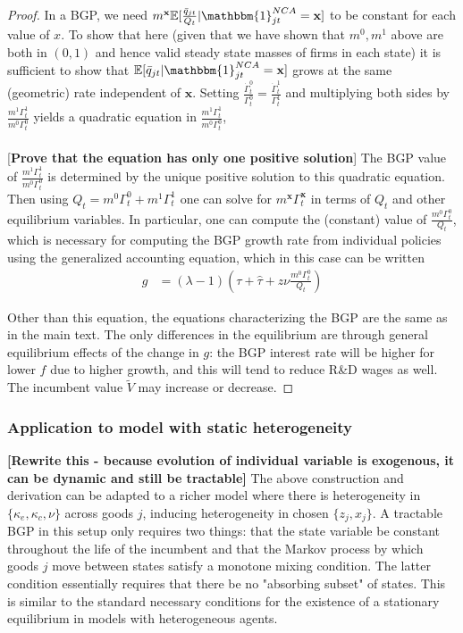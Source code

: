 \documentclass[11pt,english]{article}
\begin{document}
\begin{proof}
	In a BGP, we need $m^{\mathbf{x}} \mathbb{E} [\frac{\bar{q}_{jt}}{Q_t} | \mathbbm{1}^{NCA}_{jt} = \mathbf{x}]$ to be constant for each value of $x$. To show that here (given that we have shown that $m^0,m^1$ above are both in $(0,1)$ and hence valid steady state masses of firms in each state) it is sufficient to show that $\mathbb{E}[ \bar{q}_{jt} | \mathbbm{1}^{NCA}_{jt} = \mathbf{x}]$ grows at the same (geometric) rate independent of $\mathbf{x}$. Setting $\frac{\dot{\Gamma}_t^0}{\Gamma_t^0} = \frac{\dot{\Gamma}_t^1}{\Gamma_t^1}$ and multiplying both sides by $\frac{m^1 \Gamma_t^1}{m^0 \Gamma_t^0}$ yields a quadratic equation in $\frac{m^1 \Gamma_t^1}{m^0 \Gamma_t^0}$,
	\begin{align}
		[in progress]
	\end{align}
	
	[\textbf{Prove that the equation has only one positive solution}] The BGP value of $\frac{m^1 \Gamma_t^1}{m^0 \Gamma_t^0}$ is determined by the unique positive solution to this quadratic equation. Then using $Q_t = m^0 \Gamma_t^0 + m^1 \Gamma_t^1$ one can solve for $m^{\mathbf{x}} \Gamma_t^{\mathbf{x}}$ in terms of $Q_t$ and other equilibrium variables. In particular, one can compute the (constant) value of $\frac{m^0 \Gamma_t^0}{Q_t}$, which is necessary for computing the BGP growth rate from individual policies using the generalized accounting equation, which in this case can be written 
	\begin{align}
	g &= (\lambda - 1) (\tau + \hat{\tau} + z \nu  \frac{m^0 \Gamma^0_t}{Q_t} )
	\end{align}
	
	Other than this equation, the equations characterizing the BGP are the same as in the main text. The only differences in the equilibrium are through general equilibrium effects of the change in $g$: the BGP interest rate will be higher for lower $f$ due to higher growth, and this will tend to reduce R\&D wages as well. The incumbent value $\tilde{V}$ may increase or decrease.
\end{proof}

\subsubsection{Application to model with static heterogeneity}\label{appendix:model:heterogeneity}

\textbf{[Rewrite this - because evolution of individual variable is exogenous, it can be dynamic and still be tractable]} The above construction and derivation can be adapted to a richer model where there is heterogeneity in $\{\kappa_e, \kappa_c, \nu\}$ across goods $j$, inducing heterogeneity in chosen $\{z_j,x_j\}$. A tractable BGP in this setup only requires two things: that the state variable be constant throughout the life of the incumbent and that the Markov process by which goods $j$ move between states satisfy a monotone mixing condition. The latter condition essentially requires that there be no "absorbing subset" of states. This is similar to the standard necessary conditions for the existence of a stationary equilibrium in models with heterogeneous agents.
\end{document}
